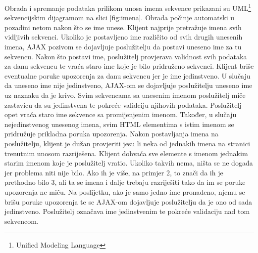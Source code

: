 Obrada i spremanje podataka prilikom unosa imena sekvence prikazani su
UML\footnote{Unified Modeling Language} sekvencijskim dijagramom na slici
\ref{fig:imena}. Obrada počinje automatski u pozadini netom nakon što se ime
unese. Klijent najprije pretražuje imena svih vidljivih sekvenci. Ukoliko je
postavljeno ime različito od svih drugih unesenih imena, AJAX pozivom se
dojavljuje poslužitelju da postavi uneseno ime za tu sekvencu. Nakon što postavi
ime, poslužitelj provjerava validnost svih podataka za danu sekvencu te vraća
staro ime koje je bilo pridruženo sekvenci. Klijent briše eventualne poruke
upozorenja za danu sekvencu jer je ime jedinstveno. U slučaju da uneseno ime
nije jedinstveno, AJAX-om se dojavljuje poslužitelju uneseno ime uz naznaku da
je krivo. Svim sekvencama sa unesenim imenom poslužitelj miče zastavicu da su
jedinstvena te pokreće validciju njihovih podataka. Poslužitelj opet vraća staro
ime sekvence sa promijenjenim imenom. Također, u slučaju nejedinstvenog unesenog
imena, svim HTML elementima s istim imenom se pridružuje prikladna poruka
upozorenja. Nakon postavljanja imena na poslužitelju, klijent je dužan
provjeriti jesu li neka od jednakih imena na stranici trenutnim unosom
razriješena. Klijent dohvaća sve elemente s imenom jednakim starim imenom koje
je poslužitelj vratio. Ukoliko takvih nema, ništa se ne događa jer problema niti
nije bilo. Ako ih je više, na primjer 2, to znači da ih je prethodno bilo 3, ali
ta se imena i dalje trebaju razriješiti tako da im se poruke upozorenja ne miču.
Na poslijetku, ako je samo jedno ime pronađeno, njemu se brišu poruke upozorenja
te se AJAX-om dojavljuje poslužitelju da je ono od sada jedinstveno. Poslužitelj
označava ime jedinstvenim te pokreće validaciju nad tom sekvencom.

